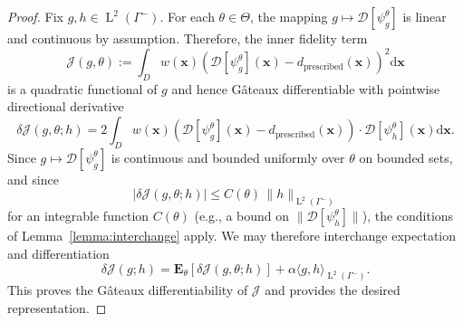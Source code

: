 \documentclass{amsart}
\newcommand{\dd}{{\mathrm d}}
\theoremstyle{plain}
\renewcommand{\vec}[1]{\ensuremath{\boldsymbol{#1}}}
\newcommand{\leb}{\text{Leb}}
\newcommand{\LL}{\ensuremath{\operatorname L}\xspace}
\renewcommand{\leb}[1]{\ensuremath{\LL^{#1}}}
\begin{document}
\begin{proof}
  Fix $g, h \in \leb2(\Gamma^-)$. For each $\theta \in \Theta$, the
  mapping $g \mapsto \mathcal{D}[\psi_g^\theta]$ is linear and
  continuous by assumption. Therefore, the inner fidelity term
  \begin{equation}
    \mathcal{J}(g, \theta) := \int_D w(\vec{x}) \left( \mathcal{D}[\psi_g^\theta](\vec{x}) - d_{\text{prescribed}}(\vec{x}) \right)^2 \dd \vec{x}
  \end{equation}
  is a quadratic functional of $g$ and hence Gâteaux differentiable
  with pointwise directional derivative
  \begin{equation}
    \delta \mathcal{J}(g, \theta; h) =
    2 \int_D w(\vec{x}) \left( \mathcal{D}[\psi_g^\theta](\vec{x}) - d_{\text{prescribed}}(\vec{x}) \right) \cdot \mathcal{D}[\psi_h^\theta](\vec{x}) \dd \vec{x}.
  \end{equation}
  Since $g \mapsto \mathcal{D}[\psi_g^\theta]$ is continuous and
  bounded uniformly over $\theta$ on bounded sets, and since
  \begin{equation}
    \left| \delta \mathcal{J}(g, \theta; h) \right| \leq C(\theta) \, \|h\|_{\leb2(\Gamma^-)}
  \end{equation}
  for an integrable function $C(\theta)$ (e.g., a bound on $\|
  \mathcal{D}[\psi_h^\theta] \|$), the conditions of
  Lemma~\ref{lemma:interchange} apply. We may therefore interchange
  expectation and differentiation
  \begin{equation}
    \delta \mathcal{J}(g; h) = \mathbf{E}_\theta[\delta \mathcal{J}(g, \theta; h)] + \alpha \langle g, h \rangle_{\leb2(\Gamma^-)}.
  \end{equation}
  This proves the Gâteaux differentiability of $\mathcal{J}$ and
  provides the desired representation.
\end{proof}
\end{document}
